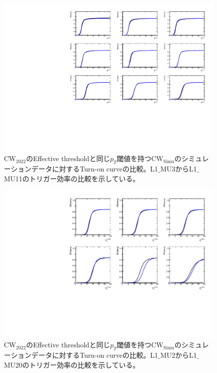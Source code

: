 \begin{figure}[htb]
  \centering
  \includegraphics[clip, width=12cm]{fig/5/v05v07_1_9.pdf}
  \caption{$\mathrm{CW_{2022}}$のEffective thresholdと同じ$p_T$閾値を持つ$\mathrm{CW_{Simu}}$のシミュレーションデータに対するTurn-on curveの比較。L1$\_$MU3からL1$\_$MU11のトリガー効率の比較を示している。}
  \label{fig:v05v07_1_9_Simu}
\end{figure}

\begin{figure}[htb]
  \centering
  \includegraphics[clip, width=12cm]{fig/5/v05v07_10_15.pdf}
  \caption{$\mathrm{CW_{2022}}$のEffective thresholdと同じ$p_T$閾値を持つ$\mathrm{CW_{Simu}}$のシミュレーションデータに対するTurn-on curveの比較。L1$\_$MU2からL1$\_$MU20のトリガー効率の比較を示している。}
  \label{fig:v05v07_12_20_Simu}
\end{figure}



